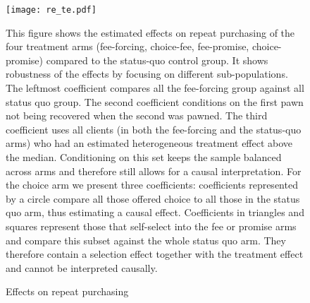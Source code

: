 \documentclass[11pt]{article}
\begin{document}
\begin{figure}[H]
        \caption{Effects on repeat purchasing}
    \label{reincidence}
    \begin{center}
        \centering
        \texttt{[image: re\_te.pdf]}
    \end{center}
     \scriptsize This figure shows the estimated effects on repeat purchasing of the four treatment arms (fee-forcing, choice-fee, fee-promise, choice-promise) compared to the status-quo control group. It shows robustness of the effects by focusing on different sub-populations. The leftmost coefficient compares all the fee-forcing group against all status quo group. The second coefficient conditions on the first pawn not being recovered when the second was pawned. The third coefficient uses all clients (in both the fee-forcing and the status-quo arms) who had an estimated heterogeneous treatment effect above the median. Conditioning on this set keeps the sample balanced across arms and therefore still allows for a causal interpretation. For the choice arm we present three coefficients: coefficients represented by a circle compare all those offered choice to all those in the status quo arm, thus estimating a causal effect. Coefficients in triangles and squares represent those that self-select into the fee or promise arms and compare this subset against the whole status quo arm. They therefore contain a selection effect together with the treatment effect and cannot be interpreted causally.
\end{figure}
\end{document}

